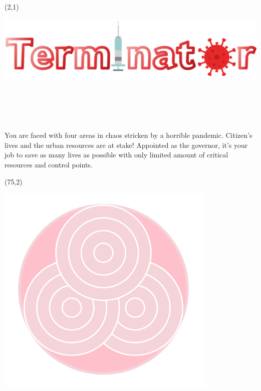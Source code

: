 \documentclass[hyperref={pdfpagelabels=false}]{beamer}
\begin{document}
\begin{frame}

	\begin{textblock}{45}(2,1)
		\begin{blankbox}
			\includegraphics[width=1000pt]{img/gamename.png} \\\hspace*{\fill} \\ \\\hspace*{\fill} \\\\\hspace*{\fill} \\

			\huge{You are faced with four areas in chaos stricken by a horrible pandemic. Citizen's lives and the urban resources are at stake! Appointed as the governor, it's your job to save as many lives as possible with only limited amount of critical resources and control points.}
		\end{blankbox}
	\end{textblock}

	\begin{textblock}{39}(75,2)
		\begin{blankbox}
			\includegraphics[width=300pt]{img/Teamlogo.png}


\end{blankbox}
\end{textblock}
\end{frame}
\end{document}
